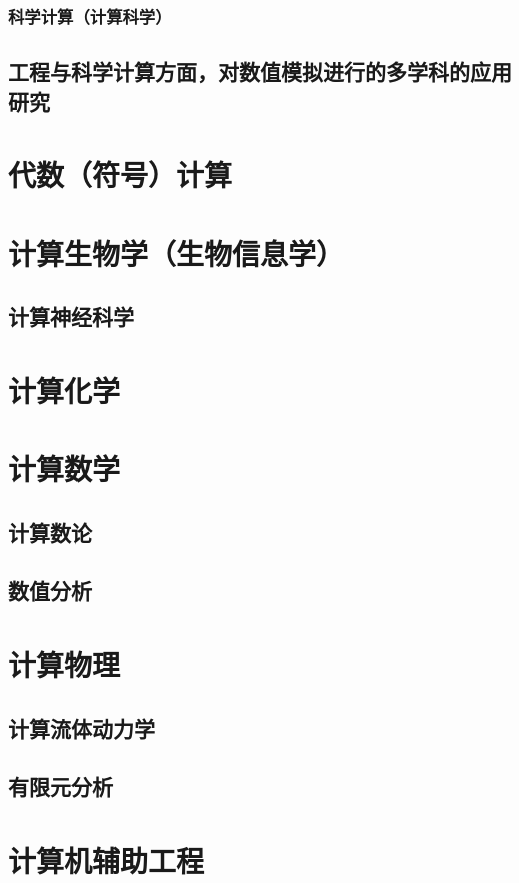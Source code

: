 \documentclass[UTF8]{../computerUniverse}
\begin{document}
\subsection{科学计算（计算科学）}
\section{工程与科学计算方面，对数值模拟进行的多学科的应用研究}

\chapter{代数（符号）计算}
\chapter{计算生物学（生物信息学）}
\section{计算神经科学}

\chapter{计算化学}

\chapter{计算数学}
\section{计算数论}
\section{数值分析}

\chapter{计算物理}
\section{计算流体动力学}
\section{有限元分析}

\chapter{计算机辅助工程}
\end{document}
